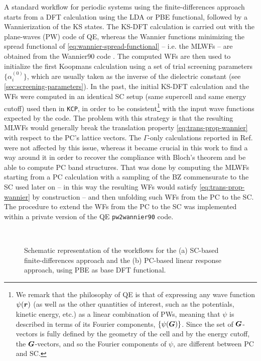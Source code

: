 A standard workflow for periodic systems using the finite-differences approach starts from a DFT calculation using the LDA or PBE functional, followed by a Wannierization of the KS states. The KS-DFT calculation is carried out with the plane-waves (PW) code of QE, whereas the Wannier functions minimizing the spread functional of \cref{eq:wannier-spread-functional} -- i.e. the MLWFs -- are obtained from the Wannier90 code \cite{pizzi_wannier90_2020}. The computed WFs are then used to initialize the first Koopmans calculation using a set of trial screening parameters $\{ \alpha_i^{(0)} \}$, which are usually taken as the inverse of the dielectric constant (see \cref{sec:screening-parameters}). In the past, the initial KS-DFT calculation and the WFs were computed in an identical SC setup (same supercell and same energy cutoff) used then in \texttt{KCP}, in order to be consistent\footnote{
We remark that the philosophy of QE is that of expressing any wave function $\psi({\bm r})$ (as well as the other quantities of interest, such as the potentials, kinetic energy, etc.) as a linear combination of PWs, meaning that $\psi$ is described in terms of its Fourier components, $\{ \psi({\bm G}) \}$. Since the set of ${\bm G}$-vectors is fully defined by the geometry of the cell and by the energy cutoff, the ${\bm G}$-vectors, and so the Fourier components of $\psi$, are different between PC and SC.
}
with the input wave functions expected by the \kcp code. The problem with this strategy is that the resulting MLWFs would generally break the translation property \eqref{eq:trans-prop-wannier} with respect to the PC's lattice vectors. The $\Gamma$-only calculations reported in Ref.~\cite{nguyen_koopmans-compliant_2018} were not affected by this issue, whereas it became crucial in this work to find a way around it in order to recover the compliance with Bloch's theorem and be able to compute PC band structures. That was done by computing the MLWFs starting from a PC calculation with a sampling of the BZ commensurate to the SC used later on -- in this way the resulting WFs would satisfy \cref{eq:trans-prop-wannier} by construction -- and then unfolding such WFs from the PC to the SC. The procedure to extend the WFs from the PC to the SC was implemented within a private version of the QE \texttt{pw2wannier90} code.

\begin{figure}
    \centering
     \\
    \caption[Finite-differences and DFPT workflow schemes]{Schematic representation of the workflows for the (a) SC-based finite-differences approach and the (b) PC-based linear response approach, using PBE as base DFT functional.}
    \label{fig:workflow}
\end{figure}

